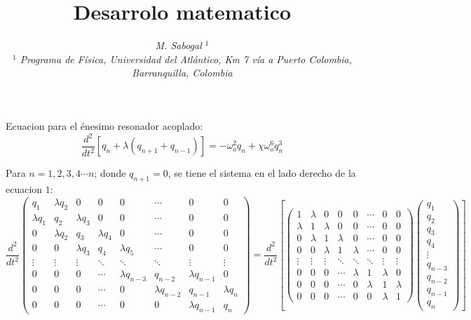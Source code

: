 \documentclass[11pt,letterpaper]{article}
\begin{document}
\title{\huge{\textbf{ Desarrolo matematico}}}
\author{\small \textit{M. Sabogal $^{1}$}\\
	\small \textit{ $^{1}$ Programa de Física, Universidad del Atlántico, Km 7 vía a Puerto Colombia, Barranquilla, Colombia}} %
\date{} 


Ecuacion para el énesimo resonador acoplado: 
\begin{equation}
\dfrac{d^{2}}{dt^{2}} \left[ q_{n} + \lambda \left( q_{n+1} + q_{n-1}\right) \right] = - \omega_{o}^{2} q_{n} + \chi \omega_{o}^{6} q_{n}^{3} 
\end{equation}
\par 
Para $n=1,2,3,4 \cdots n$; donde $q_{n+1}=0$, se tiene el sistema en el lado derecho de la ecuacion $1$:
$$ \dfrac{d^{2}}{dt^{2}} \left(
\begin{matrix}
q_{1} & \lambda q_{2} & 0 & 0 & 0 & \cdots & 0 & 0 \\
\lambda q_{1} & q_{2} & \lambda q_{3} & 0 & 0 & \cdots & 0 & 0\\
0 & \lambda q_{2} & q_{3} & \lambda q_{4}  & 0 & \cdots & 0& 0 \\
0 & 0 & \lambda q_{3} & q_{4} & \lambda q_{5}  & \cdots & 0 & 0 \\
\vdots & \vdots & \vdots & \ddots & \ddots & \ddots & \vdots & \vdots \\
0 & 0 & 0 & \cdots & \lambda q_{n-3} &  q_{n-2} & \lambda q_{n-1} &0\\    
0 & 0 & 0 & \cdots & 0 & \lambda q_{n-2} & q_{n-1} & \lambda q_{n}\\    
0 & 0 & 0 & \cdots & 0 & 0 & \lambda q_{n-1} & q_{n}     
\end{matrix} \right) =  \dfrac{d^{2}}{dt^{2}} \left[ 
\left(
\begin{matrix}
1 & \lambda  & 0 & 0 & 0 & \cdots & 0 & 0 \\
\lambda & 1 & \lambda  & 0 & 0 & \cdots & 0 & 0\\
0 & \lambda  & 1 & \lambda   & 0 & \cdots & 0& 0 \\
0 & 0 & \lambda  & 1 & \lambda   & \cdots & 0 & 0 \\
\vdots & \vdots & \vdots & \ddots & \ddots & \ddots & \vdots & \vdots \\
0 & 0 & 0 & \cdots & \lambda  &  1 & \lambda &0\\    
0 & 0 & 0 & \cdots & 0 & \lambda  & 1 & \lambda\\    
0 & 0 & 0 & \cdots & 0 & 0 & \lambda  & 1    
\end{matrix} \right) \left(
\begin{matrix}
q_{1}\\
q_{2}\\
q_{3}\\
q_{4}\\
\vdots\\
q_{n-3}\\
q_{n-2}\\
q_{n-1}\\
q_{n}
\end{matrix} \right) \right] $$
\end{document}
